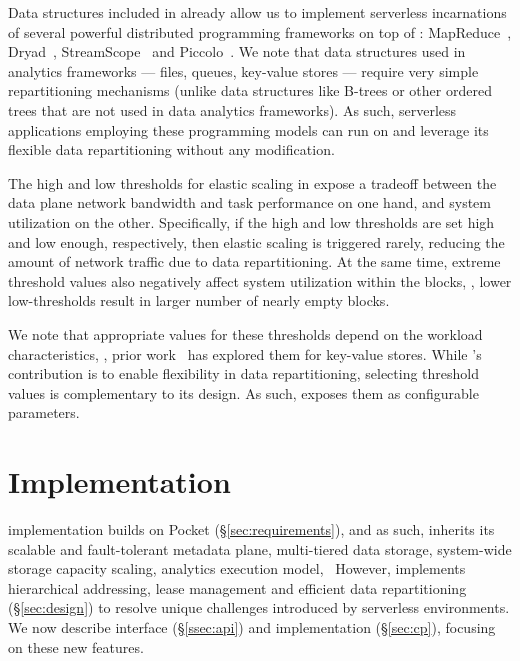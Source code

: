 Data structures included in \jiffy already allow us to implement serverless incarnations of several powerful distributed programming frameworks on top of \jiffy: MapReduce~\cite{mapreduce,spark}, Dryad~\cite{dryad}, StreamScope~\cite{streamscope} and Piccolo~\cite{piccolo}. We note that data structures used in analytics frameworks --- files, queues, key-value stores --- require very simple repartitioning mechanisms (unlike data structures like B-trees or other ordered trees that are not used in data analytics frameworks). As such, serverless applications employing these programming models can run on \jiffy and leverage its flexible data repartitioning without any modification. 

 The high and low thresholds for elastic scaling in \jiffy expose a tradeoff between the data plane network bandwidth and task performance on one hand, and system utilization on the other. Specifically, if the high and low thresholds are set high and low enough, respectively, then elastic scaling is triggered rarely, reducing the amount of network traffic due to data repartitioning. At the same time, extreme threshold values also negatively affect system utilization within the blocks, \eg, lower low-thresholds result in larger number of nearly empty blocks. 

We note that appropriate values for these thresholds depend on the workload characteristics, \eg, prior work~\cite{mongo-shard, ceph-shard} has explored them for key-value stores. While \jiffy's contribution is to enable flexibility in data repartitioning, selecting threshold values is complementary to its design. As such, \jiffy exposes them as configurable parameters.



\section{\jiffy Implementation}
\label{sec:jiffyimplementation}

\jiffy implementation builds on Pocket (\S\ref{sec:requirements}), and as such, inherits its scalable and fault-tolerant metadata plane, multi-tiered data storage, system-wide storage capacity scaling, analytics execution model, \etc~However, \jiffy implements hierarchical addressing, lease management and efficient data repartitioning (\S\ref{sec:design}) to resolve unique challenges introduced by serverless environments. We now describe \jiffy interface (\S\ref{ssec:api}) and implementation (\S\ref{sec:cp}), focusing on these new features.

